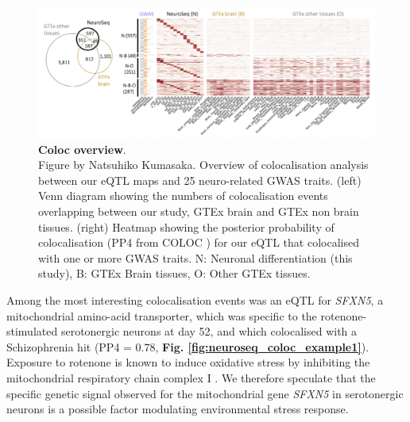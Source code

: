 \begin{figure}[h]
\centering
\includegraphics[width=16cm]{Chapter5/Fig/neuroseq_coloc_overview.png}
\caption[Coloc overview]{\textbf{Coloc overview}.\\
Figure by Natsuhiko Kumasaka.
Overview of colocalisation analysis between our eQTL maps and 25 neuro-related GWAS traits. 
(left) Venn diagram showing the numbers of colocalisation events overlapping between our study, GTEx brain and GTEx non brain tissues. 
(right) Heatmap showing the posterior probability of colocalisation (PP4 from COLOC \cite{giambartolomei2014bayesian}) for our eQTL that colocalised with one or more GWAS traits. 
N: Neuronal differentiation (this study), B: GTEx Brain tissues, O: Other GTEx tissues.}
\label{fig:neuroseq_coloc_overview}
\end{figure}

\newpage

Among the most interesting colocalisation events was an eQTL for \textit{SFXN5}, a mitochondrial amino-acid transporter, which was specific to the rotenone-stimulated serotonergic neurons at day 52, and which colocalised with a Schizophrenia hit (PP4 = 0.78, \textbf{Fig. \ref{fig:neuroseq_coloc_example1}}). 
Exposure to rotenone is known to induce oxidative stress by inhibiting the mitochondrial respiratory chain complex I \cite{palmer1968studies, betarbet2000chronic}. 
We therefore speculate that the specific genetic signal observed for the mitochondrial gene \textit{SFXN5} in serotonergic neurons is a possible factor modulating environmental stress response.

